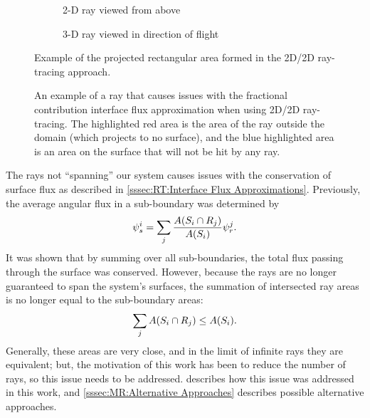 {{{      \begin{figure}[htbp]
          \centering
          \begin{subfigure}[t]{0.45\textwidth}
              \centering
              \def\svgwidth{0.70\linewidth}
              
              \caption{2-D ray viewed from above\label{fig:MR:MacroRayProjections}}
          \end{subfigure}%
          \begin{subfigure}[t]{0.45\textwidth}
              \centering
              \def\svgwidth{0.70\linewidth}
              
              \caption{3-D ray viewed in direction of flight\label{fig:MR:MacroRayProjectionsDOF}}
          \end{subfigure}
          \caption{Example of the projected rectangular area formed in the 2D/2D ray-tracing approach.}
          \label{figs:MR:MacroRayProjections}
      \end{figure}

      \begin{figure}[htbp]
        \centering
        \def\svgwidth{0.25\linewidth}
        
        \caption{
            An example of a ray that causes issues with the fractional contribution interface flux approximation when using 2D/2D ray-tracing.
            The highlighted red area is the area of the ray outside the domain (which projects to no surface), and the blue highlighted area is an area on the surface that will not be hit by any ray.}
        \label{fig:MR:MacroRayProjectionProblem}
      \end{figure}

      The rays not ``spanning'' our system causes issues with the conservation of surface flux as described in \cref{sssec:RT:Interface Flux Approximations}.
      Previously, the average angular flux in a sub-boundary was determined by
      \begin{equation}\label{eq:MR:Old SubBoundary Flux}
        \psi_s^i = \suml[j] \frac{A(S_i\cap R_j)}{A(S_i)}\psi_r^j.
      \end{equation}
      It was shown that by summing over all sub-boundaries, the total flux passing through the surface was conserved.
      However, because the rays are no longer guaranteed to span the system's surfaces, the summation of intersected ray areas is no longer equal to the sub-boundary areas:
      \begin{equation}\label{eq:MR:Area Imbalance}
        \suml[j] A(S_i\cap R_j) \leq A(S_i).
      \end{equation}
      Generally, these areas are very close, and in the limit of infinite rays they are equivalent; but, the motivation of this work has been to reduce the number of rays, so this issue needs to be addressed.
       describes how this issue was addressed in this work, and \cref{sssec:MR:Alternative Approaches} describes possible alternative approaches.

}}}
